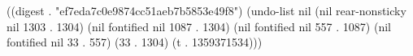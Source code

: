 
((digest . "ef7eda7c0e9874cc51aeb7b5853e49f8") (undo-list nil (nil rear-nonsticky nil 1303 . 1304) (nil fontified nil 1087 . 1304) (nil fontified nil 557 . 1087) (nil fontified nil 33 . 557) (33 . 1304) (t . 1359371534)))
